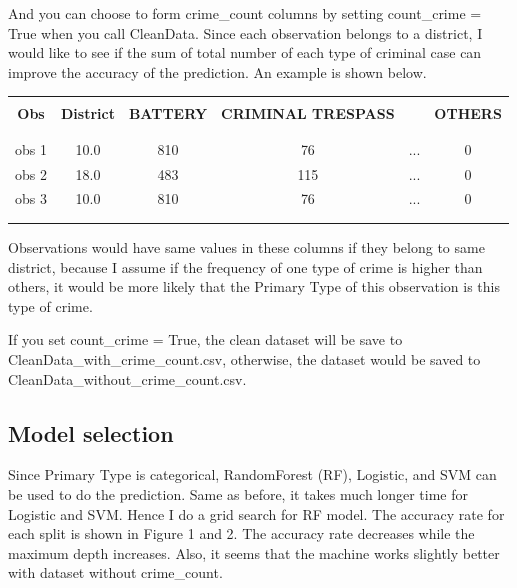 \documentclass[12pt]{article}
\begin{document}
And you can choose to form crime\_count columns by setting count\_crime = True
when you call CleanData. Since each observation belongs to a district, I would 
like to see if the sum of total number of each type of criminal case can improve
the accuracy of the prediction. An example is shown below.

\begin{table}[h!]
\begin{center}
	

\begin{tabular}{cccccc}
\\ [-1.8ex]
\hline
\hline \\[-1.8ex]
{\textbf {Obs}}& {\textbf {District}} & {\textbf {BATTERY}} & {\textbf {CRIMINAL TRESPASS}} & &{\textbf {OTHERS}} \\
\\ [-1.8ex]
\hline \\[-1.8ex]

obs 1 &10.0   &810 	&76		  &...	&0	\\
obs 2 &18.0   &483 	&115		&...	&0	\\
obs 3 &10.0   &810 	&76		  &...	&0	\\
\\ [-1.8ex]
\hline \\[-1.8ex]

\end{tabular}


\end{center}
\end{table}


Observations would have same values in these columns if they belong to same
district, because I assume if the frequency of one type of crime is higher than
others, it would be more likely that the Primary Type of this observation is
this type of crime.

If you set count\_crime = True, the clean dataset will be save to 
CleanData\_with\_crime\_count.csv, otherwise, the dataset would be saved to
CleanData\_without\_crime\_count.csv.


\subsection{Model selection}
Since Primary Type is categorical, RandomForest (RF), Logistic, and SVM can be
used to do the prediction. Same as before, it takes much longer time for 
Logistic and SVM. Hence I do a grid search for RF model. The accuracy rate
for each split is shown in Figure 1 and 2. The accuracy rate decreases while
the maximum depth increases. Also, it seems that the machine works slightly
better with dataset without crime\_count.
\end{document}
